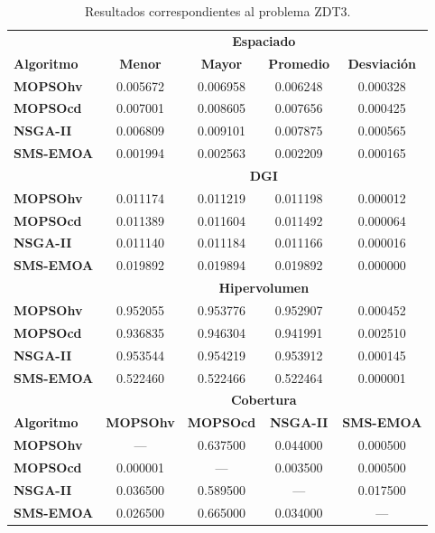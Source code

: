  \begin{table}
 \begin{center}
  \begin{tabular}{|l|cc|cc|} \hline
    & \multicolumn{4}{|c|}{\textbf{Espaciado}} \\ 
	\textbf{Algoritmo} & \textbf{Menor} & \textbf{Mayor} & \textbf{Promedio} & \textbf{Desviaci\'on} \\  \hline\hline
	\textbf{MOPSOhv} &0.005672 & 0.006958 & 0.006248 & 0.000328  \\ 
	\textbf{MOPSOcd} &0.007001 & 0.008605 & 0.007656 & 0.000425 \\ 
	\textbf{NSGA-II} &0.006809 & 0.009101 & 0.007875 & 0.000565 \\  
	\textbf{SMS-EMOA}&0.001994 & 0.002563 & 0.002209 & 0.000165 \\  
	\hline\hline
    & \multicolumn{4}{|c|}{\textbf{DGI}} \\ 	\hline \hline
	\textbf{MOPSOhv} &0.011174 & 0.011219 & 0.011198 & 0.000012 \\ 
	\textbf{MOPSOcd} &0.011389 & 0.011604 & 0.011492 & 0.000064 \\ 
	\textbf{NSGA-II} &0.011140 & 0.011184 & 0.011166 & 0.000016 \\  
	\textbf{SMS-EMOA}&0.019892 & 0.019894 & 0.019892 & 0.000000 \\  
	\hline\hline
    & \multicolumn{4}{|c|}{\textbf{Hipervolumen}} \\ \hline \hline
	\textbf{MOPSOhv} &0.952055 & 0.953776 & 0.952907 & 0.000452  \\ 
	\textbf{MOPSOcd} &0.936835 & 0.946304 & 0.941991 & 0.002510 \\ 
	\textbf{NSGA-II} &0.953544 & 0.954219 & 0.953912 & 0.000145  \\  
	\textbf{SMS-EMOA}&0.522460 & 0.522466 & 0.522464 & 0.000001  \\  
	\hline
    & \multicolumn{4}{|c|}{\textbf{Cobertura}} \\ \hline\hline 
	\textbf{Algoritmo} & \textbf{MOPSOhv} & \textbf{MOPSOcd} & \textbf{NSGA-II} & \textbf{SMS-EMOA} \\  \hline \hline
	\textbf{MOPSOhv} &---       & 0.637500 & 0.044000 & 0.000500 \\ 
	\textbf{MOPSOcd} & 0.000001 & ---      & 0.003500 & 0.000500 \\ 
	\textbf{NSGA-II} & 0.036500 & 0.589500 & ---      & 0.017500 \\  
	\textbf{SMS-EMOA}& 0.026500 & 0.665000 & 0.034000 & --- \\  
	\hline\hline
	\end{tabular}
\caption{Resultados correspondientes al problema ZDT3.}
  \label{tab:zdt3}
\end{center}
\end{table}

